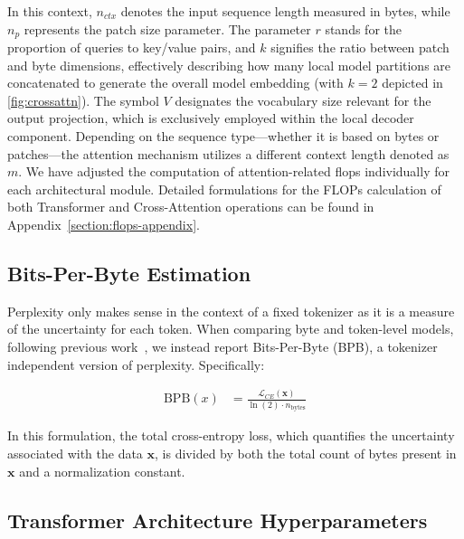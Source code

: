 In this context, $n_{ctx}$ denotes the input sequence length measured in bytes, while $n_p$ represents the patch size parameter. The parameter $r$ stands for the proportion of queries to key/value pairs, and $k$ signifies the ratio between patch and byte dimensions, effectively describing how many local model partitions are concatenated to generate the overall model embedding (with $k=2$ depicted in \autoref{fig:crossattn}). The symbol $V$ designates the vocabulary size relevant for the output projection, which is exclusively employed within the local decoder component. Depending on the sequence type—whether it is based on bytes or patches—the attention mechanism utilizes a different context length denoted as $m$. We have adjusted the computation of attention-related flops individually for each architectural module. Detailed formulations for the FLOPs calculation of both Transformer and Cross-Attention operations can be found in Appendix~\ref{section:flops-appendix}.

\subsection{Bits-Per-Byte Estimation} Perplexity only makes sense in the context of a fixed tokenizer as it is a measure of the uncertainty for each token. When comparing byte and token-level models, following previous work~\citep{xue2022byt5, yu2023megabyte, wang2024mambabyte}, we instead report Bits-Per-Byte (BPB), a tokenizer independent version of perplexity. Specifically:

\begin{align}
    \text{BPB}(x)&= \frac{\mathcal{L}_{CE}(\pmb{x})}{\ln(2)\cdot n_{\text{bytes}}}
\end{align}

In this formulation, the total cross-entropy loss, which quantifies the uncertainty associated with the data $\pmb{x}$, is divided by both the total count of bytes present in $\pmb{x}$ and a normalization constant.

\subsection{Transformer Architecture Hyperparameters}

